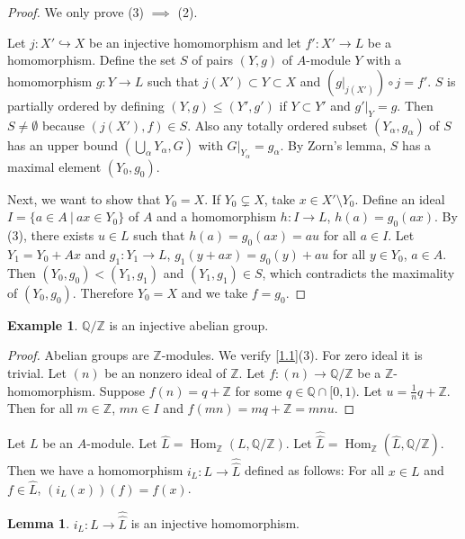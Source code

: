 \documentclass{amsart}
\numberwithin{equation}{section}
\theoremstyle{plain}
\theoremstyle{definition}
\newtheorem{lem}[equation]{Lemma}
\newtheorem{eg}[equation]{Example}
\DeclareMathOperator{\Hom}{Hom}
\begin{document}
\begin{proof}
	We only prove (3) $ \implies $ (2). 
	
	Let $j:X'\hookrightarrow X $ be an injective homomorphism and let $ f': X'\to L $ be a homomorphism. 
	Define the set $ S $ of pairs $ (Y,g) $ of $ A$-module $ Y $ with a homomorphism $ g: Y\to L $ such that $j(X')\subset Y\subset X$ and $(g|_{j(X')})\circ j=f'$. 
	 $ S $ is partially ordered by defining $ (Y,g)\le(Y',g') $ if $Y\subset Y'$ and $g'|_Y=g$.  
	Then $ S\ne\emptyset $ because $ (j(X'),f)\in S $. 
	Also any totally ordered subset $ (Y_{\alpha}, g_{\alpha}) $ of $ S $ has an upper bound $ (\bigcup\limits_{\alpha}Y_{\alpha}, G) $ with $ G|_{Y_{\alpha}}=g_{\alpha} $. 
	By Zorn's lemma, $ S $ has a maximal element $ (Y_0,g_0) $. 
	
	Next, we want to show that $ Y_0=X $. 
	If $ Y_0 \subsetneq X$, take $ x\in X'\setminus Y_0 $. 
	Define an ideal $ I=\{a\in A~|~ax\in Y_0\} $ of $ A $ and a homomorphism $ h: I\to L $, $ h(a)=g_0(ax) $. 
	By (3), there exists $ u\in L $ such that $ h(a)=g_0(ax)=au $ for all $ a\in I $. 
	Let $ Y_1=Y_0+Ax $ and $ g_1: Y_1\to L $, $ g_1(y+ax)=g_0(y)+au $ for all $ y\in Y_0 $, $ a\in A $. 
	Then $ (Y_0,g_0)<(Y_1,g_1) $ and $ (Y_1,g_1)\in S $, which contradicts the maximality of $ (Y_0,g_0) $. 
	Therefore $ Y_0=X $ and we take $ f=g_0 $. 
\end{proof}

\begin{eg}\label{1.2}
	 $ \mathbb Q/\mathbb Z $ is an injective abelian group. 
\end{eg}

\begin{proof}
	Abelian groups are $ \mathbb Z $-modules. 
	We verify \cref{1.1}(3). 
	For zero ideal it is trivial. 
	Let $(n)$ be an nonzero ideal of $ \mathbb Z $. 
	Let $ f:(n)\to \mathbb Q/\mathbb Z $ be a $ \mathbb Z $-homomorphism. 
	Suppose $ f(n)=q+\mathbb Z $ for some $ q\in\mathbb Q\cap[0,1) $. 
	Let $ u=\frac{1}{n}q+\mathbb Z $. 
	Then for all $ m\in\mathbb Z $, $ mn\in I $ and $ f(mn)=mq+\mathbb Z=mnu $. 
\end{proof}

Let $ L $ be an $ A $-module. 
Let $ \widehat{L}=\Hom_{\mathbb Z}(L,\mathbb Q/\mathbb Z) $. 
Let $ \widehat{\widehat{L}}=\Hom_{\mathbb Z}(\widehat{L},\mathbb Q/\mathbb Z) $. 
Then we have a homomorphism $ i_L: L\to \widehat{\widehat{L}} $ defined as follows: For all $ x\in L $ and $ f\in\widehat{L} $, $ (i_L(x))(f)=f(x) $.  

\begin{lem}\label{1.3}
	$ i_L :L\to \widehat{\widehat{L}}$ is an injective homomorphism. 
\end{lem}
\end{document}
